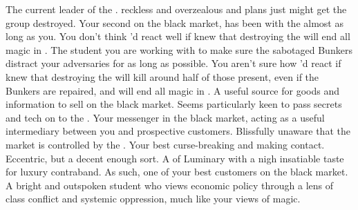\documentclass[char]{GL2020}
\begin{document}
\begin{contacts}
	\contact{\cChupLeader{}} The current leader of the \pGoaties{}. \cChupLeader{\Theyare} reckless and overzealous and \cChupLeader{\their} plans just might get the group destroyed.
	\contact{\cChupInventor{}} Your second on the black market, \cChupInventor{} has been with the \pGoaties{} almost as long as you. You don't think \cChupInventor{\they}'d react well if  \cChupInventor{\they} knew that destroying the \pSc{} will end all magic in \pEarth{}.
	\contact{\cChupStudent{}} The student you are working with to make sure the sabotaged Bunkers distract your adversaries for as long as possible. You aren't sure how \cChupStudent{\they}'d react if \cChupStudent{\they} knew that destroying the \pSc{} will kill around half of those present, even if the Bunkers are repaired, and will end all magic in \pEarth{}.
	\contact{\cEthics{}} A useful source for goods and information to sell on the black market. Seems particularly keen to pass secrets and tech on to the \pShip{}.
	\contact{\cLibAssist{}} Your messenger in the black market, acting as a useful intermediary between you and prospective customers. Blissfully unaware that the market is controlled by the \pGoaties{}.
	\contact{\cCurse{}} Your best curse-breaking and making contact. Eccentric, but a decent enough sort.
	\contact{\cHedonist{}} A \cHedonist{\cleric} of Luminary with a nigh insatiable taste for luxury contraband. As such, one of your best customers on the black market.
	\contact{\cPirateChild{\full}} A bright and outspoken \pShip{} student who views economic policy through a lens of class conflict and systemic oppression, much like your views of magic.
\end{contacts}
\end{document}
